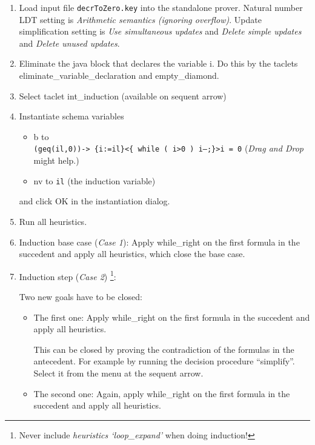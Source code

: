 \documentclass[11pt]{article}
\newcommand{\java}[1]{\mbox{\textsf{#1}}}
\begin{document}
\begin{enumerate}
	\item Load input file \texttt{decrToZero.key} into the standalone
	prover. Natural number LDT setting is \emph{Arithmetic semantics
	(ignoring overflow)}. Update simplification setting is \emph{Use
	simultaneous updates} and \emph{Delete simple updates} and \emph{Delete
	unused updates}.  

	\item Eliminate the java block that declares the variable \java{i}. Do
	this by the taclets eliminate\_variable\_declaration and
	empty\_diamond.  

	\item Select taclet \textsf{int\_induction} (available on sequent
	arrow) \item Instantiate schema variables 

	\begin{itemize} 

		\item \textsf{b} to \\ \texttt{(geq(il,0))-> \{i:=il\}<\{ while
( i>0 )  i--;\}>i = 0}			
(\emph{Drag and Drop} might help.)
		\item \textsf{nv} 
			to \texttt{il} (the induction variable) 
		\end{itemize}
		and click \textsf{OK} in the instantiation dialog.
	\item Run all heuristics.
	\item Induction base case (\emph{Case 1}):
		Apply \textsf{while\_right} on the first formula in the
		succedent and apply all heuristics, which close the base case.
	\item Induction step (\emph{Case 2}) \footnote{Never include
\emph{heuristics `loop\_expand'} when doing induction!}:
		
		Two new goals have to be closed:
		\begin{itemize}
			\item The first one: Apply \textsf{while\_right} on the
				first formula in the 
				succedent and apply all heuristics.

				This can be closed by proving the contradiction
				of the formulas in the antecedent. For example
				by running the decision procedure
				``simplify''. Select it from the menu at the
				sequent arrow.

			\item The second one: Again, apply
			\textsf{while\_right} on the first formula in the
			succedent and apply all heuristics.


\end{itemize}
\end{enumerate}
\end{document}
